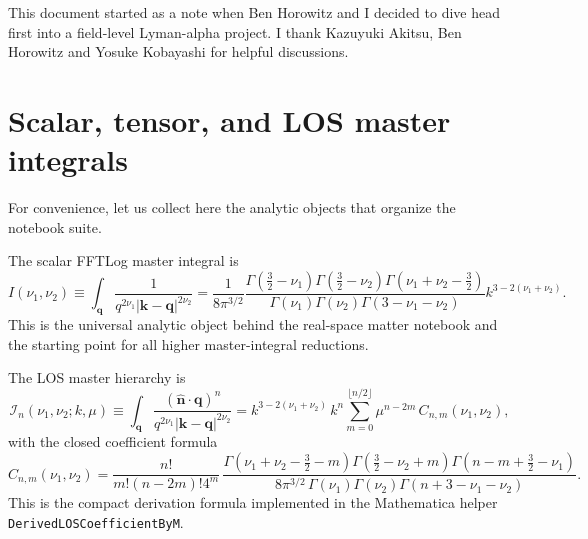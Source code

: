 \documentclass[a4paper,11pt]{article}
\newcommand{\codefont}[1]{{\texttt{#1}}}
\newcommand{\nhat}{\hat{n}}
\newcommand{\vnhat}{\bm{\nhat}}
\newcommand{\vk}{\bm{k}}
\newcommand{\vq}{\bm{q}}
\newcommand{\<}{\langle}
\renewcommand{\>}{\rangle}
\begin{document}
\begin{acknowledgments}
This document started as a note when Ben Horowitz and I decided to dive head first into a field-level Lyman-alpha project. I thank Kazuyuki Akitsu, Ben Horowitz and Yosuke Kobayashi for helpful discussions.
\end{acknowledgments}

\clearpage
\appendix

\section{Scalar, tensor, and LOS master integrals}
\label{app:master_hierarchy}

For convenience, let us collect here the analytic objects that organize the notebook suite.

The scalar FFTLog master integral is
\begin{equation}
I(\nu_1,\nu_2)
\equiv
\int_{\vq}\frac{1}{q^{2\nu_1}|\vk-\vq|^{2\nu_2}}
=
\frac{1}{8\pi^{3/2}}
\frac{
\Gamma\!\left(\frac32-\nu_1\right)
\Gamma\!\left(\frac32-\nu_2\right)
\Gamma\!\left(\nu_1+\nu_2-\frac32\right)
}{
\Gamma(\nu_1)\Gamma(\nu_2)\Gamma(3-\nu_1-\nu_2)
}
k^{3-2(\nu_1+\nu_2)}.
\label{eq:scalar_master_appendix_note}
\end{equation}
This is the universal analytic object behind the real-space matter notebook and the starting point for all higher master-integral reductions.

The LOS master hierarchy is
\begin{equation}
\mathcal I_n(\nu_1,\nu_2;k,\mu)
\equiv
\int_{\vq}
\frac{(\vnhat\cdot \vq)^n}{q^{2\nu_1}|\vk-\vq|^{2\nu_2}}
=
k^{3-2(\nu_1+\nu_2)}\,k^n
\sum_{m=0}^{\lfloor n/2\rfloor}
\mu^{n-2m}\,C_{n,m}(\nu_1,\nu_2),
\end{equation}
with the closed coefficient formula
\begin{equation}
C_{n,m}(\nu_1,\nu_2)
=
\frac{n!}{m!(n-2m)!4^m}\,
\frac{
\Gamma\!\left(\nu_1+\nu_2-\frac32-m\right)
\Gamma\!\left(\frac32-\nu_2+m\right)
\Gamma\!\left(n-m+\frac32-\nu_1\right)
}{
8\pi^{3/2}\,
\Gamma(\nu_1)\Gamma(\nu_2)\Gamma(n+3-\nu_1-\nu_2)
}.
\label{eq:los_coeff_appendix_note}
\end{equation}
This is the compact derivation formula implemented in the Mathematica helper \codefont{DerivedLOSCoefficientByM}.
\end{document}
